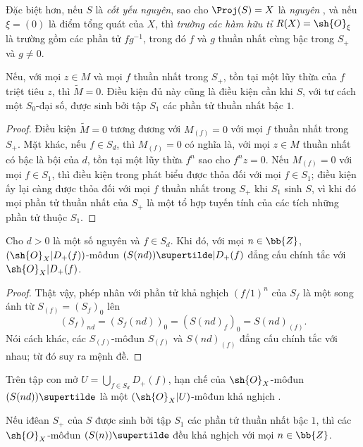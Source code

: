 \documentclass[oneside,10pt]{amsart}
\let\EGAOriginalLabel\label
\renewcommand{\label}[1]{\phantomsection\EGAOriginalLabel{#1}}
\begin{document}
Đặc biệt hơn, nếu $S$ là \emph{cốt yếu nguyên}, sao cho $\Proj(S)=X$ là \emph{nguyên} , và nếu $\xi=(0)$ là điểm tổng quát của $X$, thì \emph{trường các hàm hữu tỉ $R(X)=\sh{O}_\xi$} là trường gồm các phần tử $fg^{-1}$, trong đó $f$ và $g$ thuần nhất cùng bậc trong $S_+$ và $g\neq0$.

\begin{proposition}[2.5.6]
\label{II.2.5.6}
Nếu, với mọi $z\in M$ và mọi $f$ thuần nhất trong $S_+$, tồn tại một lũy thừa của $f$ triệt tiêu $z$, thì $\widetilde{M}=0$.
Điều kiện đủ này cũng là điều kiện cần khi $S$, với tư cách một $S_0$-đại số, được sinh bởi tập $S_1$ các phần tử thuần nhất bậc $1$.
\end{proposition}

\begin{proof}
Điều kiện $\widetilde{M}=0$ tương đương với $M_{(f)}=0$ với mọi $f$ thuần nhất trong $S_+$.
Mặt khác, nếu $f\in S_d$, thì $M_{(f)}=0$ có nghĩa là, với mọi $z\in M$ thuần nhất có bậc là bội của $d$, tồn tại một lũy thừa $f^n$ sao cho $f^nz=0$.
Nếu $M_{(f)}=0$ với mọi $f\in S_1$, thì điều kiện trong phát biểu được thỏa đối với mọi $f\in S_1$; điều kiện ấy lại càng được thỏa đối với mọi $f$ thuần nhất trong $S_+$ khi $S_1$ sinh $S$, vì khi đó mọi phần tử thuần nhất của $S_+$ là một tổ hợp tuyến tính của các tích những phần tử thuộc $S_1$.
\end{proof}

\begin{proposition}[2.5.7]
\label{II.2.5.7}
Cho $d>0$ là một số nguyên và $f\in S_d$.
Khi đó, với mọi $n\in\bb{Z}$, $(\sh{O}_X|D_+(f))$-môđun $(S(nd))\supertilde|D_+(f)$ đẳng cấu chính tắc với $\sh{O}_X|D_+(f)$.
\end{proposition}

\begin{proof}
Thật vậy, phép nhân với phần tử khả nghịch $(f/1)^n$ của $S_f$ là một song ánh từ $S_{(f)}=(S_f)_0$ lên
\[
  (S_f)_{nd}=(S_f(nd))_0=(S(nd)_f)_0=S(nd)_{(f)}.
\]
Nói cách khác, các $S_{(f)}$-môđun $S_{(f)}$ và $S(nd)_{(f)}$ đẳng cấu chính tắc với nhau; từ đó suy ra mệnh đề.
\end{proof}

\begin{corollary}[2.5.8]
\label{II.2.5.8}
Trên tập con mở $U=\bigcup_{f\in S_d}D_+(f)$, hạn chế của $\sh{O}_X$-môđun $(S(nd))\supertilde$ là một $(\sh{O}_X|U)$-môđun khả nghịch .
\end{corollary}

\begin{corollary}[2.5.9]
\label{II.2.5.9}
Nếu iđêan $S_+$ của $S$ được sinh bởi tập $S_1$ các phần tử thuần nhất bậc $1$, thì các $\sh{O}_X$-môđun $(S(n))\supertilde$ đều khả nghịch với mọi $n\in\bb{Z}$.
\end{corollary}
\end{document}
